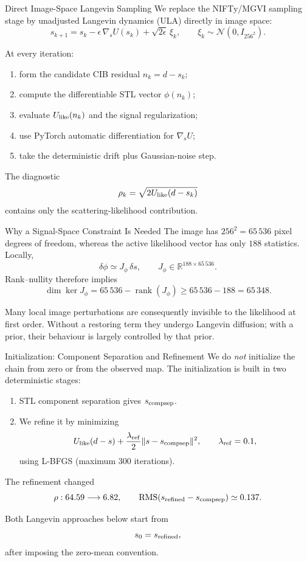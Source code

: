 \documentclass[aspectratio=169]{beamer}
\newcommand{\ph}{\phi}
\newcommand{\Ulike}{U_{\rm like}}
\begin{document}
\begin{frame}{Direct Image-Space Langevin Sampling}
  We replace the NIFTy/MGVI sampling stage by unadjusted Langevin dynamics
  (ULA) directly in image space:
  \[
    s_{k+1}
    =s_k-\epsilon\,\nabla_s U(s_k)
    +\sqrt{2\epsilon}\,\xi_k,
    \qquad
    \xi_k\sim\mathcal{N}(0,I_{256^2}).
  \]

  At every iteration:
  \begin{enumerate}
    \item form the candidate CIB residual \(n_k=d-s_k\);
    \item compute the differentiable STL vector \(\ph(n_k)\);
    \item evaluate \(\Ulike(n_k)\) and the signal regularization;
    \item use PyTorch automatic differentiation for \(\nabla_s U\);
    \item take the deterministic drift plus Gaussian-noise step.
  \end{enumerate}

  The diagnostic
  \[
    \rho_k=\sqrt{2\Ulike(d-s_k)}
  \]
  contains only the scattering-likelihood contribution.
\end{frame}

\begin{frame}{Why a Signal-Space Constraint Is Needed}
  The image has \(256^2=65\,536\) pixel degrees of freedom, whereas the
  active likelihood vector has only \(188\) statistics. Locally,
  \[
    \delta\ph\simeq J_\ph\,\delta s,
    \qquad
    J_\ph\in\mathbb{R}^{188\times65\,536}.
  \]
  Rank--nullity therefore implies
  \[
    \dim\ker J_\ph
    =65\,536-\operatorname{rank}(J_\ph)
    \ge65\,536-188=65\,348.
  \]

  Many local image perturbations are consequently invisible to the
  likelihood at first order. Without a restoring term they undergo Langevin
  diffusion; with a prior, their behaviour is largely controlled by that
  prior.
\end{frame}

\begin{frame}{Initialization: Component Separation and Refinement}
  We do \emph{not} initialize the chain from zero or from the observed map.
  The initialization is built in two deterministic stages:
  \begin{enumerate}
    \item STL component separation gives \(s_{\rm compsep}\).
    \item We refine it by minimizing
      \[
        \Ulike(d-s)
        +\frac{\lambda_{\rm ref}}{2}
         \lVert s-s_{\rm compsep}\rVert^2,
        \qquad \lambda_{\rm ref}=0.1,
      \]
      using L-BFGS (maximum 300 iterations).
  \end{enumerate}

  The refinement changed
  \[
    \rho:64.59\longrightarrow6.82,
    \qquad
    {\rm RMS}(s_{\rm refined}-s_{\rm compsep})\simeq0.137.
  \]

  \alert{Both Langevin approaches below start from}
  \[
    s_0=s_{\rm refined},
  \]
  after imposing the zero-mean convention.
\end{frame}
\end{document}
